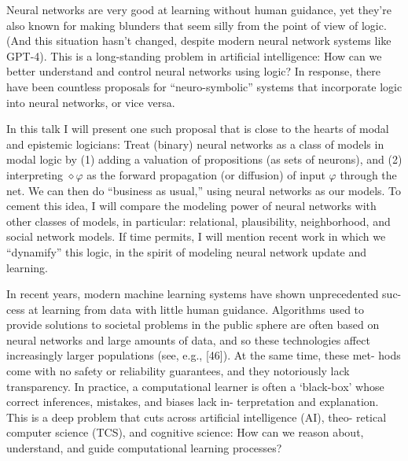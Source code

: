 \documentclass{article}
\begin{document}
\hrulefill

Neural networks are very good at learning without human guidance, yet they're
also known for making blunders that seem silly from the point of view of
logic. (And this situation hasn't changed, despite modern neural network
systems like GPT-4). This is a long-standing problem in artificial
intelligence: How can we better understand and control neural networks using
logic? In response, there have been countless proposals for ``neuro-symbolic''
systems that incorporate logic into neural networks, or vice versa.

In this talk I will present one such proposal that is close to the hearts of
modal and epistemic logicians: Treat (binary) neural networks as a class of
models in modal logic by (1) adding a valuation of propositions (as sets of
neurons), and (2) interpreting $\diamond \varphi$ as the forward propagation
(or diffusion) of input $\varphi$ through the net. We can then do ``business
as usual,'' using neural networks as our models. To cement this idea, I will
compare the modeling power of neural networks with other classes of models, in
particular: relational, plausibility, neighborhood, and social network models.
If time permits, I will mention recent work in which we ``dynamify'' this
logic, in the spirit of modeling neural network update and learning.

\hrulefill

In recent years, modern machine learning systems have shown unprecedented suc-
cess at learning from data with little human guidance. Algorithms used to
provide solutions to societal problems in the public sphere are often based on
neural networks and large amounts of data, and so these technologies affect
increasingly larger populations (see, e.g., [46]). At the same time, these
met- hods come with no safety or reliability guarantees, and they notoriously
lack transparency. In practice, a computational learner is often a `black-box'
whose correct inferences, mistakes, and biases lack in- terpretation and
explanation. This is a deep problem that cuts across artificial intelligence
(AI), theo- retical computer science (TCS), and cognitive science: How can we
reason about, understand, and guide computational learning processes?

\hrulefill
\end{document}
